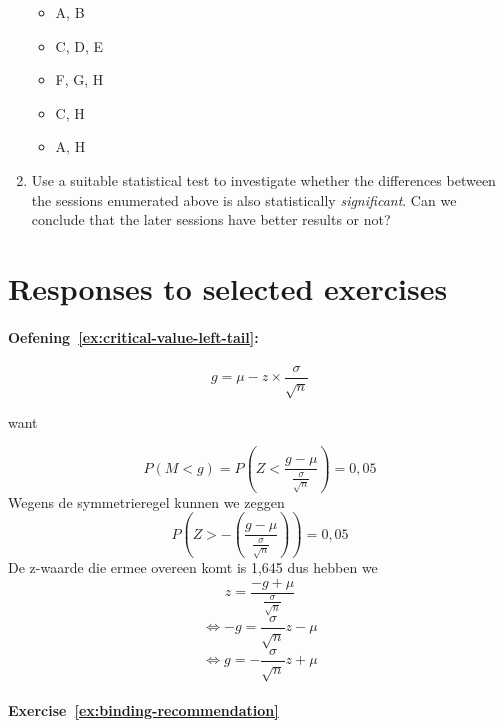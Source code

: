 \begin{exercise}
\begin{enumerate}
    \begin{itemize}
      \item A, B
      \item C, D, E
      \item F, G, H
      \item C, H
      \item A, H
    \end{itemize}
  
    \item Use a suitable statistical test to investigate whether the differences between the sessions enumerated above is also statistically \emph{significant}. Can we conclude that the later sessions have better results or not?
  \end{enumerate}
\end{exercise}

\section{Responses to selected exercises}
\label{sec:hypothesis-tests-responses}

\paragraph{Oefening~\ref{ex:critical-value-left-tail}:}

\begin{equation}
g = \mu - z \times \frac{\sigma}{\sqrt{n}}
\label{eq:kritiekeRechtseWaarde2}
\end{equation}

want

\[ P(M < g) = P\left(Z < \frac{g - \mu}{\frac{\sigma}{\sqrt{n}}}\right) = 0,05 \]
Wegens de symmetrieregel kunnen we zeggen
\[ P\left(Z > - \left( \frac{g - \mu}{\frac{\sigma}{\sqrt{n}}} \right) \right) = 0,05 \]
De z-waarde die ermee overeen komt is 1,645 dus hebben we
\[ z = \frac{-g + \mu}{\frac{\sigma}{\sqrt{n}}} \]
\[ \Leftrightarrow -g = \frac{\sigma}{\sqrt{n}} z - \mu \]
\[ \Leftrightarrow g = -\frac{\sigma}{\sqrt{n}} z + \mu \]

\paragraph{Exercise~\ref{ex:binding-recommendation}}

